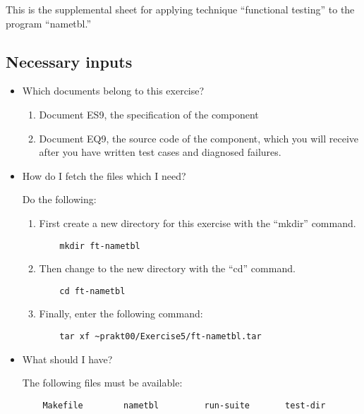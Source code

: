 
This is the supplemental sheet 
for applying technique ``functional testing''
to the program ``nametbl.'' 

\subsection*{Necessary inputs}

\begin{itemize}

\item Which documents belong to this exercise?

\begin{enumerate}
\item Document ES9, the specification of the component
\item Document EQ9, the source code of the component, which you will
receive after you have written test cases and diagnosed failures.
\end{enumerate}

\item How do I fetch the files which I need?

Do the following:

\begin{enumerate}

\item First create a new directory for this exercise with the
``mkdir'' command.
\begin{verbatim}
    mkdir ft-nametbl
\end{verbatim}

\item Then change to the new directory with the ``cd'' command.
\begin{verbatim}
    cd ft-nametbl
\end{verbatim}

\item Finally, enter the following command:
\begin{path}
\begin{verbatim}
    tar xf ~prakt00/Exercise5/ft-nametbl.tar
\end{verbatim}
\end{path}

\end{enumerate}


\item What should I have?

The following files must be available:
\begin{verbatim}
    Makefile        nametbl         run-suite       test-dir
\end{verbatim}

\end{itemize}

